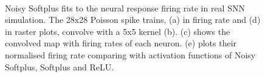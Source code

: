 \documentclass[runningheads,a4paper]{llncs}
\begin{document}
\begin{figure}[bt!]
	\centering
	\\
	\caption{
	Noisy Softplus fits to the neural response firing rate in real SNN simulation.
	The 28x28 Poisson spike trains, (a) in firing rate and (d) in raster plots, convolve with a 5x5 kernel (b).
	(c) shows the convolved map with firing rates of each neuron.
	(e) plots their normalised firing rate comparing with activation functions of Noisy Softplus, Softplus and ReLU.}
	\label{fig:cnn}
\end{figure}
\end{document}
